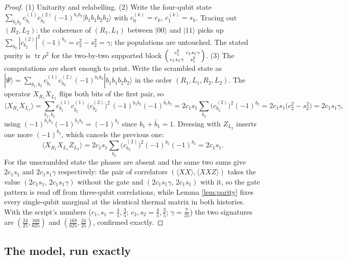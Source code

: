 \documentclass[11pt]{article}
\theoremstyle{definition}
\newcommand{\tr}{\operatorname{tr}}
\begin{document}
\begin{proof}
(1) Unitarity and relabelling. (2) Write the four-qubit state $\sum_{b_1 b_2} c^{(1)}_{b_1} c^{(2)}_{b_2} (-1)^{b_1 b_2} |b_1 b_1 b_2 b_2\rangle$ with $c^{(k)}_0 = c_k$, $c^{(k)}_1 = s_k$. Tracing out $(R_2, L_2)$: the coherence of $(R_1, L_1)$ between $|00\rangle$ and $|11\rangle$ picks up $\sum_{b_2} |c^{(2)}_{b_2}|^2 (-1)^{b_2} = c_2^2 - s_2^2 = \gamma$; the populations are untouched. The stated purity is $\tr \rho^2$ for the two-by-two supported block $\begin{psmallmatrix} c_1^2 & c_1 s_1 \gamma \\ c_1 s_1 \gamma & s_1^2 \end{psmallmatrix}$. (3) The computations are short enough to print. Write the scrambled state as $|\Psi\rangle = \sum_{b_1, b_2} c^{(1)}_{b_1} c^{(2)}_{b_2} (-1)^{b_1 b_2} |b_1 b_1 b_2 b_2\rangle$ in the order $(R_1, L_1, R_2, L_2)$. The operator $X_{R_1}X_{L_1}$ flips both bits of the first pair, so
\[
\langle X_{R_1}X_{L_1}\rangle
= \sum_{b_1, b_2} c^{(1)}_{b_1} c^{(1)}_{\bar b_1}\, \bigl(c^{(2)}_{b_2}\bigr)^2\, (-1)^{b_1 b_2}(-1)^{\bar b_1 b_2}
= 2 c_1 s_1 \sum_{b_2} \bigl(c^{(2)}_{b_2}\bigr)^2 (-1)^{b_2}
= 2 c_1 s_1 \bigl(c_2^2 - s_2^2\bigr) = 2 c_1 s_1 \gamma ,
\]
using $(-1)^{b_1 b_2}(-1)^{\bar b_1 b_2} = (-1)^{b_2}$ since $b_1 + \bar b_1 = 1$. Dressing with $Z_{L_2}$ inserts one more $(-1)^{b_2}$, which cancels the previous one:
\[
\langle X_{R_1}X_{L_1} Z_{L_2}\rangle
= 2 c_1 s_1 \sum_{b_2} \bigl(c^{(2)}_{b_2}\bigr)^2 (-1)^{b_2}(-1)^{b_2}
= 2 c_1 s_1 .
\]
For the unscrambled state the phases are absent and the same two sums give $2 c_1 s_1$ and $2 c_1 s_1 \gamma$ respectively: the pair of correlators $(\langle XX\rangle, \langle XXZ\rangle)$ takes the value $(2c_1s_1,\, 2c_1s_1\gamma)$ without the gate and $(2c_1s_1\gamma,\, 2c_1s_1)$ with it, so the gate pattern is read off from three-qubit correlations, while Lemma \ref{lem:parity} fixes every single-qubit marginal at the identical thermal matrix in both histories. With the script's numbers ($c_1, s_1 = \tfrac45, \tfrac35$; $c_2, s_2 = \tfrac45, \tfrac35$; $\gamma = \tfrac{7}{25}$) the two signatures are $(\tfrac{24}{25}, \tfrac{168}{625})$ and $(\tfrac{168}{625}, \tfrac{24}{25})$, confirmed exactly.
\end{proof}

\subsection{The model, run exactly}\label{subsec:ledger}
\end{document}
